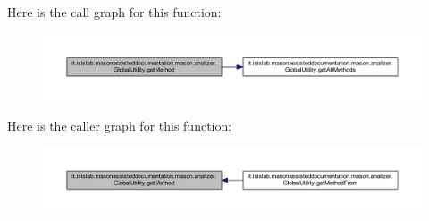Here is the call graph for this function\-:
\nopagebreak
\begin{figure}[H]
\begin{center}
\leavevmode
\includegraphics[width=350pt]{classit_1_1isislab_1_1masonassisteddocumentation_1_1mason_1_1analizer_1_1_global_utility_afd0ff2a55bc28dd92665234871976820_cgraph}
\end{center}
\end{figure}




Here is the caller graph for this function\-:
\nopagebreak
\begin{figure}[H]
\begin{center}
\leavevmode
\includegraphics[width=350pt]{classit_1_1isislab_1_1masonassisteddocumentation_1_1mason_1_1analizer_1_1_global_utility_afd0ff2a55bc28dd92665234871976820_icgraph}
\end{center}
\end{figure}


